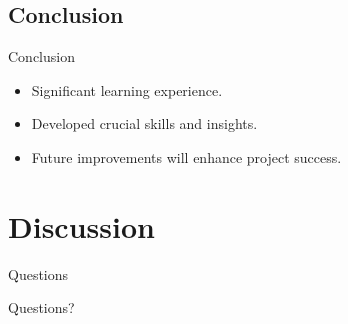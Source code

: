\documentclass{beamer}
\begin{document}
\subsection{Conclusion}
\begin{frame}{Conclusion}
    \begin{itemize}
        \item Significant learning experience.
        \item Developed crucial skills and insights.
        \item Future improvements will enhance project success.
    \end{itemize}
\end{frame}


\section{Discussion}



\begin{frame}{Questions}
    \begin{center}
        \Huge{Questions?}
    \end{center}
\end{frame}
\end{document}
